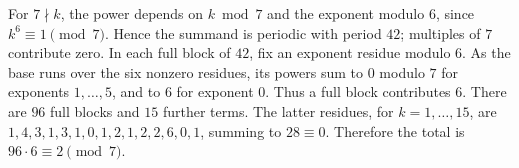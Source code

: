 For $7\nmid k$, the power depends on $k\bmod7$ and the exponent modulo $6$, since $k^6\equiv1\pmod7$. Hence the summand is periodic with period $42$; multiples of $7$ contribute zero. In each full block of $42$, fix an exponent residue modulo $6$. As the base runs over the six nonzero residues, its powers sum to $0$ modulo $7$ for exponents $1,\ldots,5$, and to $6$ for exponent $0$. Thus a full block contributes $6$. There are $96$ full blocks and $15$ further terms. The latter residues, for $k=1,\ldots,15$, are $1,4,3,1,3,1,0,1,2,1,2,2,6,0,1$, summing to $28\equiv0$. Therefore the total is $96\cdot6\equiv\boxed2\pmod7$.

